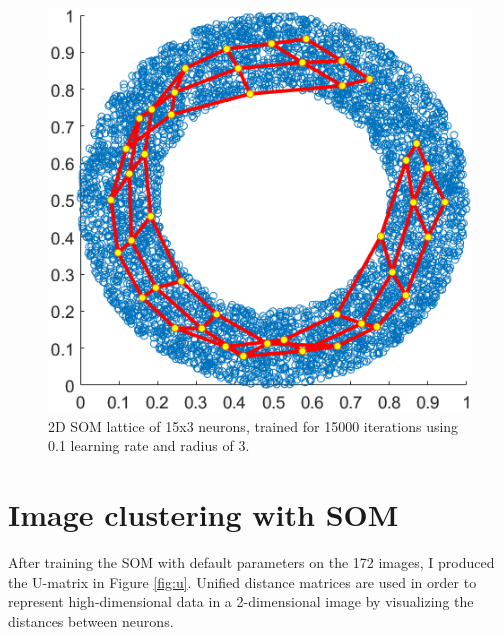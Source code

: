 \documentclass[a4paper,11pt,twocolumn]{article}
\begin{document}
\begin{figure}[!h]
  \centering
  \includegraphics[width=\linewidth]{figures/2d.png}
  \caption{2D SOM lattice of 15x3 neurons, trained for 15000 iterations using 0.1 learning rate and radius of 3.}
  \label{fig:2d}
\end{figure}

\section{Image clustering with SOM}

After training the SOM with default parameters on the 172 images, I produced the U-matrix in Figure \ref{fig:u}. Unified distance matrices are used in order to represent high-dimensional data in a 2-dimensional image by visualizing the distances between neurons.
\end{document}
